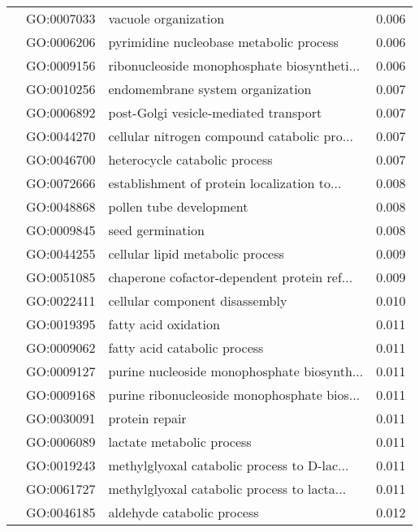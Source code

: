 \begin{longtable}{lllr}
   & GO:0007033 &                         vacuole organization &         0.006 \\
   & GO:0006206 &      pyrimidine nucleobase metabolic process &         0.006 \\
   & GO:0009156 &  ribonucleoside monophosphate biosyntheti... &         0.006 \\
   & GO:0010256 &             endomembrane system organization &         0.007 \\
   & GO:0006892 &        post-Golgi vesicle-mediated transport &         0.007 \\
   & GO:0044270 &  cellular nitrogen compound catabolic pro... &         0.007 \\
   & GO:0046700 &                heterocycle catabolic process &         0.007 \\
   & GO:0072666 &  establishment of protein localization to... &         0.008 \\
   & GO:0048868 &                      pollen tube development &         0.008 \\
   & GO:0009845 &                             seed germination &         0.008 \\
   & GO:0044255 &             cellular lipid metabolic process &         0.009 \\
   & GO:0051085 &  chaperone cofactor-dependent protein ref... &         0.009 \\
   & GO:0022411 &               cellular component disassembly &         0.010 \\
   & GO:0019395 &                         fatty acid oxidation &         0.011 \\
   & GO:0009062 &                 fatty acid catabolic process &         0.011 \\
   & GO:0009127 &  purine nucleoside monophosphate biosynth... &         0.011 \\
   & GO:0009168 &  purine ribonucleoside monophosphate bios... &         0.011 \\
   & GO:0030091 &                               protein repair &         0.011 \\
   & GO:0006089 &                    lactate metabolic process &         0.011 \\
   & GO:0019243 &  methylglyoxal catabolic process to D-lac... &         0.011 \\
   & GO:0061727 &  methylglyoxal catabolic process to lacta... &         0.011 \\
   & GO:0046185 &                   aldehyde catabolic process &         0.012 \\

\end{longtable}
